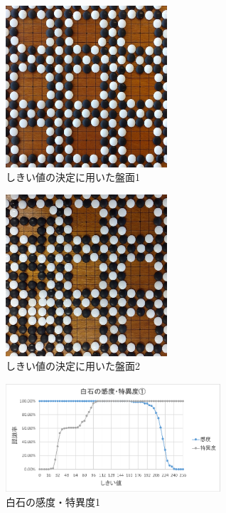 \documentclass[openright]{nitocs}
\numberwithin{equation}{section}
\begin{document}
            \begin{figure}[tb] %
                \begin{center}
                \includegraphics[clip,width=60mm]{DSC_0087/boardImg.jpg} 
                \caption{しきい値の決定に用いた盤面1}
                \label{DSC0087}
                \end{center}
            \end{figure}

            \begin{figure}[tb] %
                \begin{center}
                \includegraphics[clip,width=60mm]{DSC_0100/boardImg.jpg} 
                \caption{しきい値の決定に用いた盤面2}
                \label{DSC0100}
                \end{center}
            \end{figure}

            \begin{figure}[tb] %
                \begin{center}
                \includegraphics[clip,width=80mm]{Case1_White_TPF_TNF.eps} 
                \caption{白石の感度・特異度1}
                \label{Case1White}
                \end{center}
            \end{figure}
            
\end{document}

